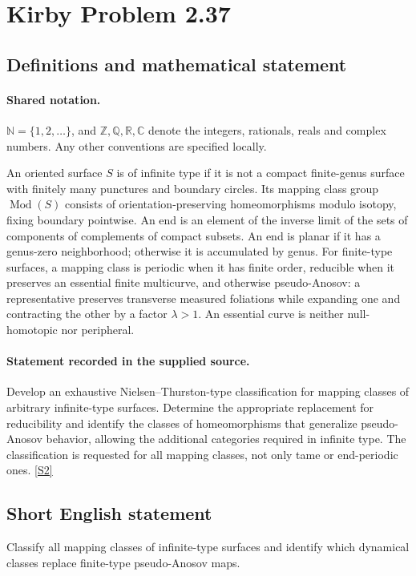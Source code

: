 \documentclass[11pt]{article}
\newcommand{\sref}[2]{\hyperlink{source:#1:#2}{[S#2]}}
\begin{document}
\section{Kirby Problem 2.37}\label{statement}

\subsection{Definitions and mathematical statement}

\paragraph{Shared notation.}$\mathbb N=\{1,2,\ldots\}$, and $\mathbb Z,\mathbb Q,\mathbb R,\mathbb C$ denote the integers, rationals, reals and complex numbers. Any other conventions are specified locally.


An oriented surface $S$ is of infinite type if it is not a compact finite-genus surface with finitely many punctures and boundary circles. Its mapping class group $\operatorname{Mod}(S)$ consists of orientation-preserving homeomorphisms modulo isotopy, fixing boundary pointwise. An end is an element of the inverse limit of the sets of components of complements of compact subsets. An end is planar if it has a genus-zero neighborhood; otherwise it is accumulated by genus. For finite-type surfaces, a mapping class is periodic when it has finite order, reducible when it preserves an essential finite multicurve, and otherwise pseudo-Anosov: a representative preserves transverse measured foliations while expanding one and contracting the other by a factor $\lambda>1$. An essential curve is neither null-homotopic nor peripheral.
\paragraph{Statement recorded in the supplied source.}
Develop an exhaustive Nielsen--Thurston-type classification for mapping classes of arbitrary infinite-type surfaces. Determine the appropriate replacement for reducibility and identify the classes of homeomorphisms that generalize pseudo-Anosov behavior, allowing the additional categories required in infinite type. The classification is requested for all mapping classes, not only tame or end-periodic ones. \sref{statement}{2}

\subsection{Short English statement}
Classify all mapping classes of infinite-type surfaces and identify which dynamical classes replace finite-type pseudo-Anosov maps.
\end{document}
